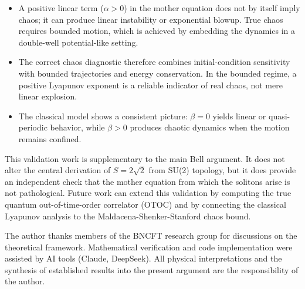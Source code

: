 ﻿\documentclass[11pt,a4paper]{article}
\begin{document}
\begin{itemize}
\item A positive linear term ($\alpha>0$) in the mother equation does not by itself imply chaos; it can produce linear instability or exponential blowup. True chaos requires bounded motion, which is achieved by embedding the dynamics in a double-well potential-like setting.
\item The correct chaos diagnostic therefore combines initial-condition sensitivity with bounded trajectories and energy conservation. In the bounded regime, a positive Lyapunov exponent is a reliable indicator of real chaos, not mere linear explosion.
\item The classical model shows a consistent picture: $\beta=0$ yields linear or quasi-periodic behavior, while $\beta>0$ produces chaotic dynamics when the motion remains confined.
\end{itemize}

This validation work is supplementary to the main Bell argument. It does not alter the central derivation of $S = 2\sqrt{2}$ from SU(2) topology, but it does provide an independent check that the mother equation from which the solitons arise is not pathological. Future work can extend this validation by computing the true quantum out-of-time-order correlator (OTOC) and by connecting the classical Lyapunov analysis to the Maldacena-Shenker-Stanford chaos bound.

\begin{acknowledgments}
The author thanks members of the BNCFT research group for discussions on the theoretical framework. Mathematical verification and code implementation were assisted by AI tools (Claude, DeepSeek). All physical interpretations and the synthesis of established results into the present argument are the responsibility of the author.
\end{acknowledgments}
\end{document}
